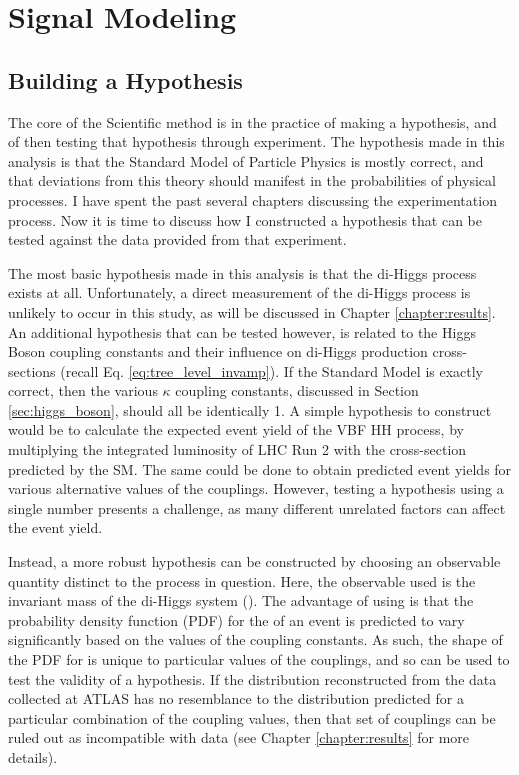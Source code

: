 \chapter{Signal Modeling} \label{chapter:signal}

\section{Building a Hypothesis}

    The core of the Scientific method is in the practice of making a hypothesis,
        and of then testing that hypothesis through experiment.
    The hypothesis made in this analysis is that the Standard Model of Particle Physics is mostly correct,
        and that deviations from this theory should manifest in the probabilities of physical processes.
    I have spent the past several chapters discussing the experimentation process.
    Now it is time to discuss how I constructed a hypothesis that can be tested against the data provided from that experiment.

    The most basic hypothesis made in this analysis is that the di-Higgs process exists at all.
    Unfortunately, a direct measurement of the di-Higgs process is unlikely to occur in this study, as will be discussed in Chapter \ref{chapter:results}.
    An additional hypothesis that can be tested however,
        is related to the Higgs Boson coupling constants and their influence on di-Higgs production cross-sections
        (recall Eq. \ref{eq:tree_level_invamp}).
    If the Standard Model is exactly correct, then the various $\kappa$ coupling constants,
        discussed in Section \ref{sec:higgs_boson},
        should all be identically 1.
    A simple hypothesis to construct would be to calculate the expected event yield of the VBF \to HH process,
        by multiplying the integrated luminosity of LHC Run 2 with the cross-section predicted by the SM.
    The same could be done to obtain predicted event yields for various alternative values of the couplings.
    However, testing a hypothesis using a single number presents a challenge, as many different unrelated factors can affect the event yield.

    Instead, a more robust hypothesis can be constructed by choosing an observable quantity distinct to the process in question.
    Here, the observable used is the invariant mass of the di-Higgs system (\mhh).
    The advantage of using \mhh is that the probability density function (PDF) for the \mhh of an event
        is predicted to vary significantly based on the values of the \kappa coupling constants.
    As such, the shape of the PDF for \mhh is unique to particular values of the couplings, 
        and so can be used to test the validity of a hypothesis.
    If the \mhh distribution reconstructed from the data collected at ATLAS has no resemblance to
        the \mhh distribution predicted for a particular combination of the coupling values,
        then that set of couplings can be ruled out as incompatible with data
        (see Chapter \ref{chapter:results} for more details).

